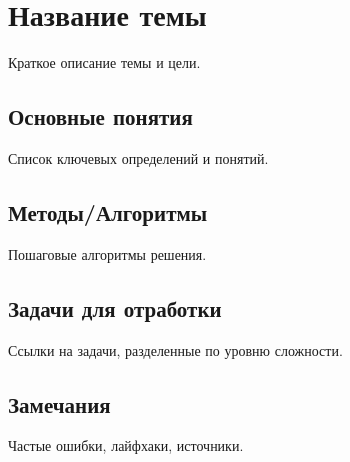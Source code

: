 \section{Название темы}
Краткое описание темы и цели.

\subsection{Основные понятия}
Список ключевых определений и понятий.

\subsection{Методы/Алгоритмы}
Пошаговые алгоритмы решения.

\subsection{Задачи для отработки}
Ссылки на задачи, разделенные по уровню сложности.

\subsection{Замечания}
Частые ошибки, лайфхаки, источники.


